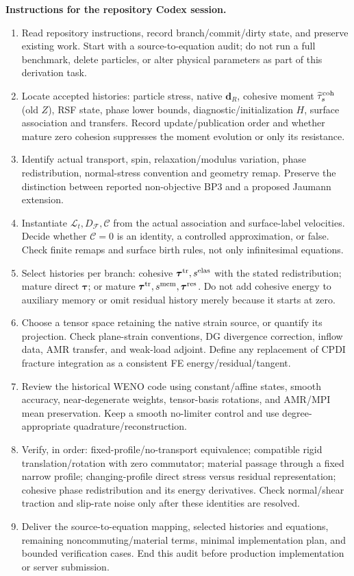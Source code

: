 \documentclass[10pt,letterpaper]{article}
\newcommand{\F}{\mathcal F}
\newcommand{\LL}{\mathscr L}
\newcommand{\CC}{\bm{\mathcal C}}
\newcommand{\ta}{\bm\tau}
\newcommand{\tat}{\bm\tau^{\rm tr}}
\newcommand{\tar}{\bm\tau^{\rm res}}
\newcommand{\sel}{s^{\rm elas}}
\newcommand{\smem}{s^{\rm mem}}
\newcommand{\Z}{\widetilde\tau_s^{\rm coh}}
\newcommand{\ds}{D_{\F}}
\begin{document}
\textbf{Instructions for the repository Codex session.}
\begin{enumerate}
\item Read repository instructions, record branch/commit/dirty state, and preserve existing work. Start with a source-to-equation audit; do not run a full benchmark, delete particles, or alter physical parameters as part of this derivation task.
\item Locate accepted histories: particle stress, native $\bm d_R$, cohesive moment $\Z$ (old $Z$), RSF state, phase lower bounds, diagnostic/initialization $H$, surface association and transfers. Record update/publication order and whether mature zero cohesion suppresses the moment evolution or only its resistance.
\item Identify actual transport, spin, relaxation/modulus variation, phase redistribution, normal-stress convention and geometry remap. Preserve the distinction between reported non-objective BP3 and a proposed Jaumann extension.
\item Instantiate $\LL_t,\ds,\CC$ from the actual association and surface-label velocities. Decide whether $\CC=0$ is an identity, a controlled approximation, or false. Check finite remaps and surface birth rules, not only infinitesimal equations.
\item Select histories per branch: cohesive $\tat,\sel$ with the stated redistribution; mature direct $\ta$; or mature $\tat,\smem,\tar$. Do not add cohesive energy to auxiliary memory or omit residual history merely because it starts at zero.
\item Choose a tensor space retaining the native strain source, or quantify its projection. Check plane-strain conventions, DG divergence correction, inflow data, AMR transfer, and weak-load adjoint. Define any replacement of CPDI fracture integration as a consistent FE energy/residual/tangent.
\item Review the historical WENO code using constant/affine states, smooth accuracy, near-degenerate weights, tensor-basis rotations, and AMR/MPI mean preservation. Keep a smooth no-limiter control and use degree-appropriate quadrature/reconstruction.
\item Verify, in order: fixed-profile/no-transport equivalence; compatible rigid translation/rotation with zero commutator; material passage through a fixed narrow profile; changing-profile direct stress versus residual representation; cohesive phase redistribution and its energy derivatives. Check normal/shear traction and slip-rate noise only after these identities are resolved.
\item Deliver the source-to-equation mapping, selected histories and equations, remaining noncommuting/material terms, minimal implementation plan, and bounded verification cases. End this audit before production implementation or server submission.
\end{enumerate}
\end{document}
